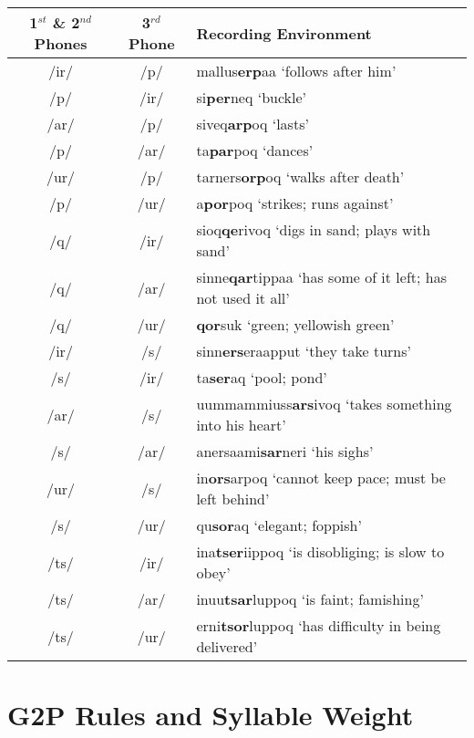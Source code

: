 \documentclass[12pt]{article}
\begin{document}
	\begin{tabular}{|c|c|l|}
	\hline
	\makecell[l]{1$^{st}$ \& 2$^{nd}$ \\ Phones} & 3$^{rd}$ Phone & Recording Environment \\
	\hline
	/ir/ & /p/ & mallus\textbf{erp}aa `follows after him'\\
	/p/ & /ir/ & si\textbf{per}neq `buckle'\\
	/ar/ & /p/ & siveq\textbf{arp}oq `lasts'\\
	/p/ & /ar/ & ta\textbf{par}poq `dances'\\
	/ur/ & /p/ & tarners\textbf{orp}oq `walks after death'\\
	/p/ & /ur/ & a\textbf{por}poq `strikes; runs against'\\
	/q/ & /ir/ & sioq\textbf{qe}rivoq `digs in sand; plays with sand'\\
	/q/ & /ar/ & sinne\textbf{qar}tippaa `has some of it left; has not used it all'\\
	/q/ & /ur/ & \textbf{qor}suk `green; yellowish green' \\
	/ir/ & /s/ & sinn\textbf{ers}eraapput `they take turns'\\
	/s/ & /ir/ & ta\textbf{ser}aq `pool; pond'\\
	/ar/ & /s/ & uummammiuss\textbf{ars}ivoq `takes something into his heart'\\
	/s/ & /ar/ & anersaami\textbf{sar}neri `his sighs'\\
	/ur/ & /s/ & in\textbf{ors}arpoq `cannot keep pace; must be left behind'\\
	/s/ & /ur/ & qu\textbf{sor}aq `elegant; foppish'\\
	/ts/ & /ir/ & ina\textbf{tser}iippoq `is disobliging; is slow to obey'\\
	/ts/ & /ar/ & inuu\textbf{tsar}luppoq `is faint; famishing'\\
	/ts/ & /ur/ & erni\textbf{tsor}luppoq `has difficulty in being delivered'\\
	\hline
	\end{tabular}

\newpage

\section{G2P Rules and Syllable Weight}
\end{document}

